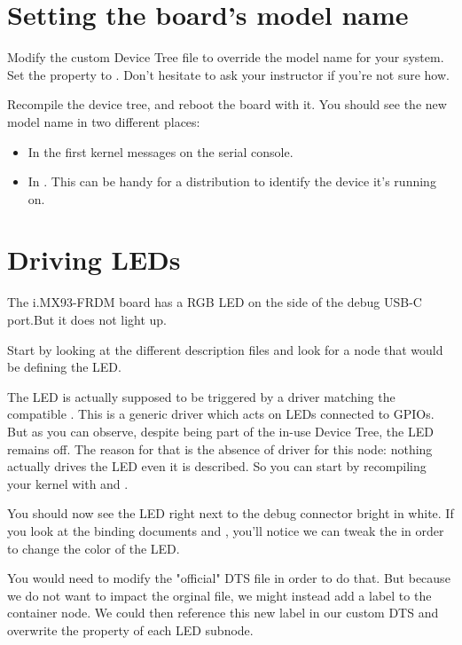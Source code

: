 \section{Setting the board's model name}

Modify the custom Device Tree file to override the model name for your
system. Set the  property to . Don't hesitate to ask your instructor if you're not sure how.

Recompile the device tree, and reboot the board with it. You should see
the new model name in two different places:

\begin{itemize}
\item In the first kernel messages on the serial console.
\item In . This can be
      handy for a distribution to identify the device it's running on.
\end{itemize}

\section{Driving LEDs}

The i.MX93-FRDM board has a RGB LED on the side of the debug USB-C port.But it does not light up.

Start by looking at the different description files and look for a node
that would be defining the LED.

The LED is actually supposed to be triggered by a driver matching
the compatible . This is a generic driver which acts on
LEDs connected to GPIOs. But as you can observe, despite being part of
the in-use Device Tree, the LED remains off. The reason for that is the
absence of driver for this node: nothing actually drives the LED even
it is described. So you can start by recompiling your kernel with
 and .

You should now see the LED right next to the debug connector bright in white. If
you look at the binding documents
 and
, you'll
notice we can tweak the  in order to change the
color of the LED.

You would need to modify the "official" DTS file in order to do that.
But because we do not want to impact the orginal file, we might instead
add a label to the  container node. We
could then reference this new label in our custom DTS and overwrite the
 property of each LED subnode.

